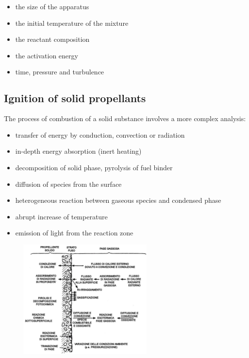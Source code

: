 \documentclass[12pt]{article}
\begin{document}
\begin{itemize}
    \item the size of the apparatus
    \item the initial temperature of the mixture
    \item the reactant composition
    \item the activation energy
    \item time, pressure and turbulence
\end{itemize}

\subsection{Ignition of solid propellants}

The process of combustion of a solid substance involves a more complex analysis:

\begin{itemize}
    \item transfer of energy by conduction, convection or radiation
    \item in-depth energy absorption (inert heating)
    \item decomposition of solid phase, pyrolysis of fuel binder
    \item diffusion of species from the surface
    \item heterogeneous reaction between gaseous species and condensed phase
    \item abrupt increase of temperature
    \item emission of light from the reaction zone
\end{itemize}

\begin{figure}[!ht]
\centering
\includegraphics[width=0.6\textwidth]{figures/solid.png}
\end{figure}
\end{document}
